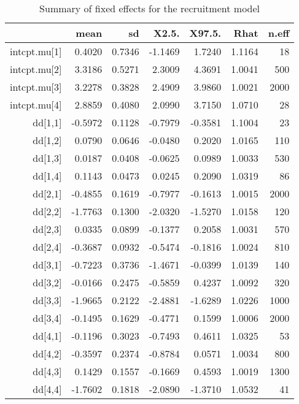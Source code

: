 \begin{table}[ht]
\centering
\caption{Summary of fixed effects for the recruitment model} 
\label{table:recruitment}
\begin{tabular}{rrrrrrr}
  \hline
 & mean & sd & X2.5. & X97.5. & Rhat & n.eff \\ 
  \hline
intcpt.mu[1] & 0.4020 & 0.7346 & -1.1469 & 1.7240 & 1.1164 &    18 \\ 
  intcpt.mu[2] & 3.3186 & 0.5271 & 2.3009 & 4.3691 & 1.0041 &   500 \\ 
  intcpt.mu[3] & 3.2278 & 0.3828 & 2.4909 & 3.9860 & 1.0021 &  2000 \\ 
  intcpt.mu[4] & 2.8859 & 0.4080 & 2.0990 & 3.7150 & 1.0710 &    28 \\ 
  dd[1,1] & -0.5972 & 0.1128 & -0.7979 & -0.3581 & 1.1004 &    23 \\ 
  dd[1,2] & 0.0790 & 0.0646 & -0.0480 & 0.2020 & 1.0165 &   110 \\ 
  dd[1,3] & 0.0187 & 0.0408 & -0.0625 & 0.0989 & 1.0033 &   530 \\ 
  dd[1,4] & 0.1143 & 0.0473 & 0.0245 & 0.2090 & 1.0319 &    86 \\ 
  dd[2,1] & -0.4855 & 0.1619 & -0.7977 & -0.1613 & 1.0015 &  2000 \\ 
  dd[2,2] & -1.7763 & 0.1300 & -2.0320 & -1.5270 & 1.0158 &   120 \\ 
  dd[2,3] & 0.0335 & 0.0899 & -0.1377 & 0.2058 & 1.0031 &   570 \\ 
  dd[2,4] & -0.3687 & 0.0932 & -0.5474 & -0.1816 & 1.0024 &   810 \\ 
  dd[3,1] & -0.7223 & 0.3736 & -1.4671 & -0.0399 & 1.0139 &   140 \\ 
  dd[3,2] & -0.0166 & 0.2475 & -0.5859 & 0.4237 & 1.0092 &   320 \\ 
  dd[3,3] & -1.9665 & 0.2122 & -2.4881 & -1.6289 & 1.0226 &  1000 \\ 
  dd[3,4] & -0.1495 & 0.1629 & -0.4771 & 0.1599 & 1.0006 &  2000 \\ 
  dd[4,1] & -0.1196 & 0.3023 & -0.7493 & 0.4611 & 1.0325 &    53 \\ 
  dd[4,2] & -0.3597 & 0.2374 & -0.8784 & 0.0571 & 1.0034 &   800 \\ 
  dd[4,3] & 0.1429 & 0.1557 & -0.1669 & 0.4593 & 1.0019 &  1300 \\ 
  dd[4,4] & -1.7602 & 0.1818 & -2.0890 & -1.3710 & 1.0532 &    41 \\ 

\end{tabular}
\end{table}
